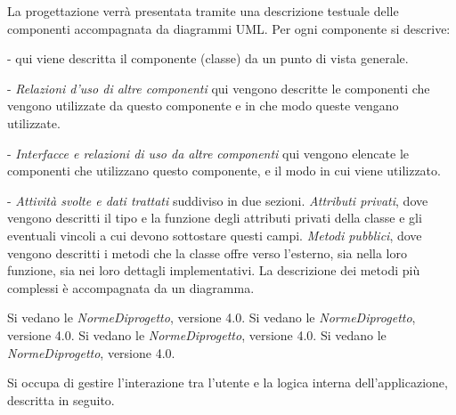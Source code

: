 La progettazione verr\`a presentata tramite una descrizione testuale delle componenti accompagnata da diagrammi UML. Per ogni componente si descrive:
\begin{elencopuntato}[\subsecindent]
\item[-]  qui viene descritta il componente (classe) da un punto di vista generale.
\item[-] \textit{Relazioni d'uso di altre componenti} qui vengono descritte le componenti che vengono utilizzate da questo componente e in che modo queste vengano utilizzate.
\item[-] \textit{Interfacce e relazioni di uso da altre componenti} qui vengono elencate le componenti che utilizzano questo componente, e il modo in cui viene utilizzato.
\item[-] \textit{Attivit\`a svolte e dati trattati} suddiviso in due sezioni. \textit{Attributi privati}, dove vengono descritti il tipo e la funzione degli attributi privati della classe e gli eventuali vincoli a cui devono sottostare questi campi. \textit{Metodi pubblici}, dove vengono descritti i metodi che la classe offre verso l'esterno, sia nella loro funzione, sia nei loro dettagli implementativi. La descrizione dei metodi pi\`u complessi \`e accompagnata da un diagramma.
\end{elencopuntato}

Si vedano le \textit{NormeDiprogetto}, versione 4.0.
Si vedano le \textit{NormeDiprogetto}, versione 4.0.
Si vedano le \textit{NormeDiprogetto}, versione 4.0.
Si vedano le \textit{NormeDiprogetto}, versione 4.0.

Si occupa di gestire l'interazione tra l'utente e la logica interna dell'applicazione, descritta in seguito.

